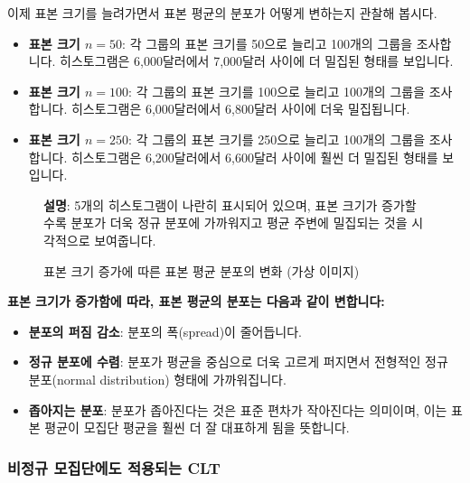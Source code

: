 \documentclass[11pt,a4paper]{book}
\theoremstyle{definition}
\begin{document}
이제 표본 크기를 늘려가면서 표본 평균의 분포가 어떻게 변하는지 관찰해 봅시다.

\begin{itemize}
    \item \textbf{표본 크기 $n=50$}: 각 그룹의 표본 크기를 50으로 늘리고 100개의 그룹을 조사합니다. 히스토그램은 6,000달러에서 7,000달러 사이에 더 밀집된 형태를 보입니다.
    \item \textbf{표본 크기 $n=100$}: 각 그룹의 표본 크기를 100으로 늘리고 100개의 그룹을 조사합니다. 히스토그램은 6,000달러에서 6,800달러 사이에 더욱 밀집됩니다.
    \item \textbf{표본 크기 $n=250$}: 각 그룹의 표본 크기를 250으로 늘리고 100개의 그룹을 조사합니다. 히스토그램은 6,200달러에서 6,600달러 사이에 훨씬 더 밀집된 형태를 보입니다.
\end{itemize}

\begin{figure}[h!]
    \centering
    \caption{표본 크기 증가에 따른 표본 평균 분포의 변화 (가상 이미지)}
    \label{fig:all_hists}
    \textbf{설명}: 5개의 히스토그램이 나란히 표시되어 있으며, 표본 크기가 증가할수록 분포가 더욱 정규 분포에 가까워지고 평균 주변에 밀집되는 것을 시각적으로 보여줍니다.
\end{figure}

\begin{summarybox}[title={CLT의 핵심 관찰 결과}]
\textbf{표본 크기가 증가함에 따라, 표본 평균의 분포는 다음과 같이 변합니다:}
\begin{itemize}
    \item \textbf{분포의 퍼짐 감소}: 분포의 폭(spread)이 줄어듭니다.
    \item \textbf{정규 분포에 수렴}: 분포가 평균을 중심으로 더욱 고르게 퍼지면서 전형적인 정규 분포(normal distribution) 형태에 가까워집니다.
    \item \textbf{좁아지는 분포}: 분포가 좁아진다는 것은 표준 편차가 작아진다는 의미이며, 이는 표본 평균이 모집단 평균을 훨씬 더 잘 대표하게 됨을 뜻합니다.
\end{itemize}
\end{summarybox}

\subsubsection*{비정규 모집단에도 적용되는 CLT}
\end{document}
